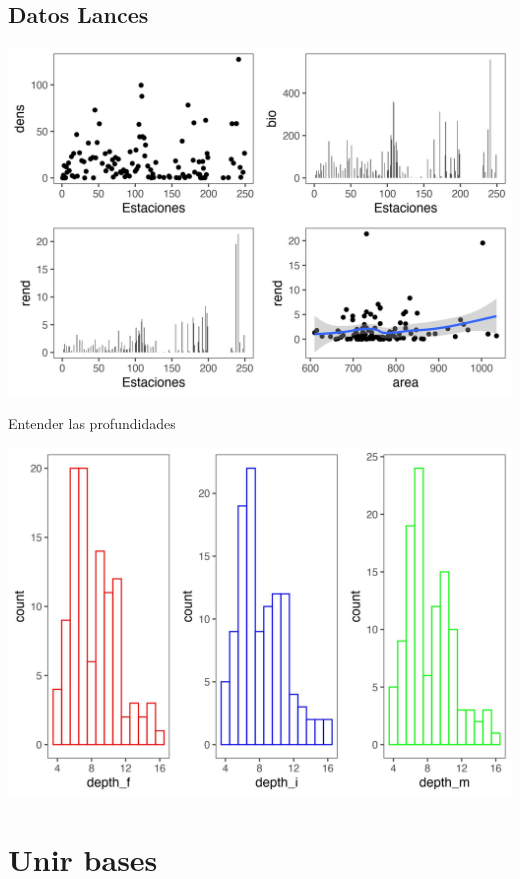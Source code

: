 \documentclass[
]{article}
\begin{document}
\hypertarget{datos-lances}{%
\subsection{Datos Lances}\label{datos-lances}}

\begin{center}\includegraphics{SAR_Method_files/figure-latex/unnamed-chunk-6-1} \end{center}

Entender las profundidades

\begin{center}\includegraphics{SAR_Method_files/figure-latex/unnamed-chunk-7-1} \end{center}

\hypertarget{unir-bases}{%
\section{Unir bases}\label{unir-bases}}
\end{document}
